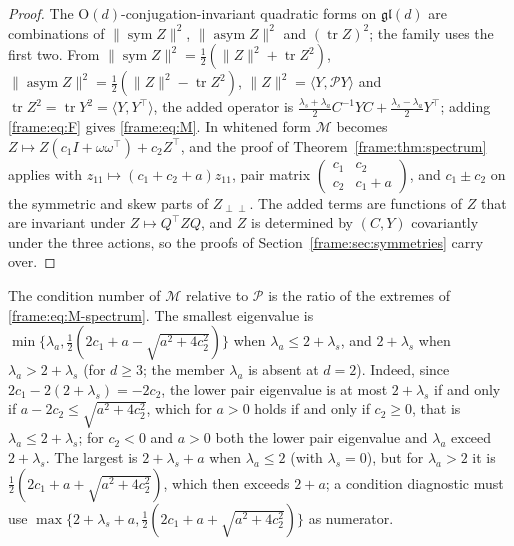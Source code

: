 \documentclass[11pt]{article}
\theoremstyle{definition}
\theoremstyle{remark}
\providecommand{\gl}{\mathfrak{gl}}
\providecommand{\tr}{\operatorname{tr}}
\providecommand{\sym}{\operatorname{sym}}
\providecommand{\asym}{\operatorname{asym}}
\providecommand{\ip}[2]{\langle #1, #2\rangle}
\begin{document}
\begin{proof}
The $\mathrm{O}(d)$-conjugation-invariant quadratic forms on $\gl(d)$ are combinations of $\|\sym Z\|^2$, $\|\asym Z\|^2$ and $(\tr Z)^2$; the family uses the first two. From $\|\sym Z\|^2=\frac12(\|Z\|^2+\tr Z^2)$, $\|\asym Z\|^2=\frac12(\|Z\|^2-\tr Z^2)$, $\|Z\|^2=\ip{Y}{\mathcal{P}Y}$ and $\tr Z^2=\tr Y^2=\ip{Y}{Y^\top}$, the added operator is $\frac{\lambda_s+\lambda_a}{2}C^{-1}YC+\frac{\lambda_s-\lambda_a}{2}Y^\top$; adding \eqref{frame:eq:F} gives \eqref{frame:eq:M}. In whitened form $\mathcal{M}$ becomes $Z\mapsto Z(c_1I+\omega\omega^\top)+c_2Z^\top$, and the proof of Theorem~\ref{frame:thm:spectrum} applies with $z_{11}\mapsto(c_1+c_2+a)z_{11}$, pair matrix $\begin{pmatrix}c_1&c_2\\c_2&c_1+a\end{pmatrix}$, and $c_1\pm c_2$ on the symmetric and skew parts of $Z_{\perp\perp}$. The added terms are functions of $Z$ that are invariant under $Z\mapsto Q^\top ZQ$, and $Z$ is determined by $(C,Y)$ covariantly under the three actions, so the proofs of Section~\ref{frame:sec:symmetries} carry over.
\end{proof}

The condition number of $\mathcal{M}$ relative to $\mathcal{P}$ is the ratio of the extremes of \eqref{frame:eq:M-spectrum}. The smallest eigenvalue is $\min\{\lambda_a,\frac12(2c_1+a-\sqrt{a^2+4c_2^2})\}$ when $\lambda_a\le2+\lambda_s$, and $2+\lambda_s$ when $\lambda_a>2+\lambda_s$ (for $d\ge3$; the member $\lambda_a$ is absent at $d=2$). Indeed, since $2c_1-2(2+\lambda_s)=-2c_2$, the lower pair eigenvalue is at most $2+\lambda_s$ if and only if $a-2c_2\le\sqrt{a^2+4c_2^2}$, which for $a>0$ holds if and only if $c_2\ge0$, that is $\lambda_a\le2+\lambda_s$; for $c_2<0$ and $a>0$ both the lower pair eigenvalue and $\lambda_a$ exceed $2+\lambda_s$. The largest is $2+\lambda_s+a$ when $\lambda_a\le2$ (with $\lambda_s=0$), but for $\lambda_a>2$ it is $\frac12(2c_1+a+\sqrt{a^2+4c_2^2})$, which then exceeds $2+a$; a condition diagnostic must use $\max\{2+\lambda_s+a,\frac12(2c_1+a+\sqrt{a^2+4c_2^2})\}$ as numerator.
\end{document}
